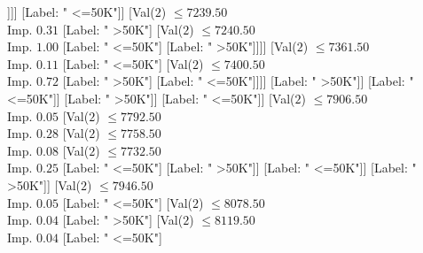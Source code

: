 \documentclass[margin=10pt]{standalone}
\begin{document}
\begin{forest}
																																																			[Label: " <=50K"]]]]
																																																[Label: " <=50K"]]
																																															[Val($2$) $ \leq 7239.50$ \\ Imp. $0.31$
																																																[Label: " >50K"]
																																																[Val($2$) $ \leq 7240.50$ \\ Imp. $1.00$
																																																	[Label: " <=50K"]
																																																	[Label: " >50K"]]]]
																																														[Val($2$) $ \leq 7361.50$ \\ Imp. $0.11$
																																															[Label: " <=50K"]
																																															[Val($2$) $ \leq 7400.50$ \\ Imp. $0.72$
																																																[Label: " >50K"]
																																																[Label: " <=50K"]]]]
																																													[Label: " >50K"]]
																																												[Label: " <=50K"]]
																																											[Label: " >50K"]]
																																										[Label: " <=50K"]]
																																									[Val($2$) $ \leq 7906.50$ \\ Imp. $0.05$
																																										[Val($2$) $ \leq 7792.50$ \\ Imp. $0.28$
																																											[Val($2$) $ \leq 7758.50$ \\ Imp. $0.08$
																																												[Val($2$) $ \leq 7732.50$ \\ Imp. $0.25$
																																													[Label: " <=50K"]
																																													[Label: " >50K"]]
																																												[Label: " <=50K"]]
																																											[Label: " >50K"]]
																																										[Val($2$) $ \leq 7946.50$ \\ Imp. $0.05$
																																											[Label: " <=50K"]
																																											[Val($2$) $ \leq 8078.50$ \\ Imp. $0.04$
																																												[Label: " >50K"]
																																												[Val($2$) $ \leq 8119.50$ \\ Imp. $0.04$
																																													[Label: " <=50K"]

\end{forest}
\end{document}
